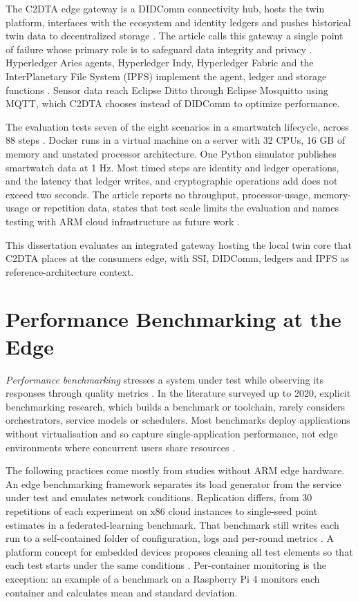 The C2DTA edge gateway is a DIDComm connectivity hub, hosts the twin platform, interfaces with the ecosystem and identity ledgers and pushes historical twin data to decentralized storage \cite{word06}. The article calls this gateway a single point of failure whose primary role is to safeguard data integrity and privacy \cite{word06}. Hyperledger Aries agents, Hyperledger Indy, Hyperledger Fabric and the InterPlanetary File System (IPFS) implement the agent, ledger and storage functions \cite{word06}. Sensor data reach Eclipse Ditto through Eclipse Mosquitto using MQTT, which C2DTA chooses instead of DIDComm to optimize performance\cite{word06}.

The evaluation tests seven of the eight scenarios in a smartwatch lifecycle, across 88 steps \cite{word06}. Docker runs in a virtual machine on a server with 32 CPUs, 16 GB of memory and unstated processor architecture. One Python simulator publishes smartwatch data at 1 Hz. Most timed steps are identity and ledger operations, and the latency that ledger writes, and cryptographic operations add does not exceed two seconds. The article reports no throughput, processor-usage, memory-usage or repetition data, states that test scale limits the evaluation and names testing with ARM cloud infrastructure as future work \cite{word06}.

This dissertation evaluates an integrated gateway hosting the local twin core that C2DTA places at the consumer\textquotesingle s edge, with SSI, DIDComm, ledgers and IPFS as reference-architecture context.

\section{Performance Benchmarking at the Edge}\label{performance-benchmarking-at-the-edge}

\noindent \emph{Performance benchmarking} stresses a system under test while observing its responses through quality metrics \cite{word26}. In the literature surveyed up to 2020, explicit benchmarking research, which builds a benchmark or toolchain, rarely considers orchestrators, service models or schedulers\cite{word26}. Most benchmarks deploy applications without virtualisation and so capture single-application performance, not edge environments where concurrent users share resources \cite{word26}.

The following practices come mostly from studies without ARM edge hardware. An edge benchmarking framework separates its load generator from the service under test and emulates network conditions\cite{word27}. Replication differs, from 30 repetitions of each experiment on x86 cloud instances \cite{word27} to single-seed point estimates in a federated-learning benchmark\cite{word28}. That benchmark still writes each run to a self-contained folder of configuration, logs and per-round metrics \cite{word28}. A platform concept for embedded devices proposes cleaning all test elements so that each test starts under the same conditions \cite{word29}. Per-container monitoring is the exception: an example of a benchmark on a Raspberry Pi 4 monitors each container and calculates mean and standard deviation\cite{word16}.

